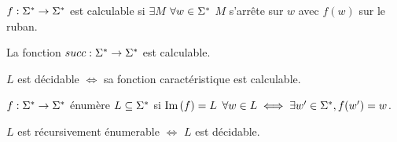 \documentclass{article}
\begin{document}
\begin{definition}
	$f : \Sigma^{*} \to \Sigma^{*}$ est calculable si $\exists M$ \tq $\forall w \in \Sigma^{*}$ $M$ s'arrête sur $w$ avec $f(w)$ sur le ruban.
\end{definition}

\begin{lemme}
	La fonction $succ : \Sigma^{*} \to \Sigma^{*}$ est calculable.
\end{lemme}

\begin{prop}
	$L$ est décidable $\iff$ sa fonction caractéristique est calculable.
\end{prop}

\begin{definition}
	$f : \Sigma^{*} \to \Sigma^{*}$ énumère $L \subseteq \Sigma^{*}$ si $\text{Im}\left(f\right) = L$ \ie $\forall w \in L \iff \exists w' \in \Sigma^{*}, f (w') = w$.
\end{definition}

\begin{prop}
	$L$ est récursivement énumerable $\iff$ $L$ est décidable.
\end{prop}
\end{document}
